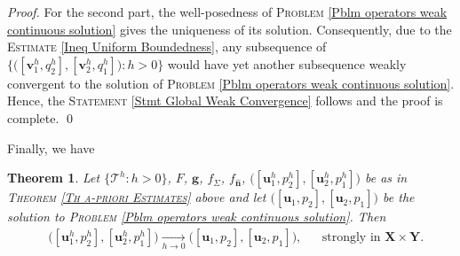 \documentclass[3p]{elsarticle}
\newtheorem{theorem}{Theorem}
\def\X{\mathbf X}
\def\Y{\mathbf Y}
\def\g{\mathbf g}
\def\uone{\mathbf{u}_{1}}
\def\uoneh{\mathbf{u}_{1}^{h}}
\def\utwo{\mathbf{u}_{2}}
\def\utwoh{\mathbf{u}_{2}^{h}}
\def\vone{\mathbf{v}_{1}}
\def\vtwo{\mathbf{v}_{2}}
\def\qone{q_{1}}
\def\qtwo{q_{2}}
\def\pone{p_{1}}
\def\poneh{p_{1}^{h}}
\def\ptwo{p_{2}}
\def\ptwoh{p_{2}^{h}}
\def\flux{f_{\bm{\hat{n}} } }
\def\stress{f_{\Sigma } }
\def\triang{\mathcal{T}}
\begin{document}
\begin{proof}
For the second part, the well-posedness of \textsc{Problem }\eqref{Pblm operators weak continuous solution} gives the uniqueness of its solution.  Consequently, due to the \textsc{Estimate} \eqref{Ineq Uniform Boundedness}, any subsequence of $\big\{\big([\vone^{h}, \qtwo^{h}],[\vtwo^{h}, \qone^{h}]\big): h > 0\big\}$ would have yet another subsequence weakly convergent  to the solution of \textsc{Problem} \eqref{Pblm operators weak continuous solution}. Hence, the \textsc{Statement} \eqref{Stmt Global Weak Convergence} follows and the proof is complete. 
%
\qed
\end{proof}
%
%
Finally, we have
%
%
\begin{theorem}\label{Th Strong Convergence of the Solutions}
Let $\{\triang^{h}: h>0\}$, $F$, $\g$, $\stress$, $\flux$, $\big([\uoneh, \ptwoh],[\utwoh, \poneh]\big)$ be as in \textsc{Theorem \ref{Th a-priori Estimates}} above and let $\big([\uone, \ptwo],[\utwo, \pone]\big)$ be the solution to \textsc{Problem} \eqref{Pblm operators weak continuous solution}. Then
%
\begin{align}\label{Stmt Global Strong Convergence}
& \big([\uoneh, \ptwoh],[\utwoh, \poneh]\big)\xrightarrow[h\rightarrow 0]{} 
\big([\uone, \ptwo],[\utwo, \pone]\big) ,&
& \text{strongly in } \X\times \Y.
\end{align}
%
\end{theorem}
%
\end{document}
